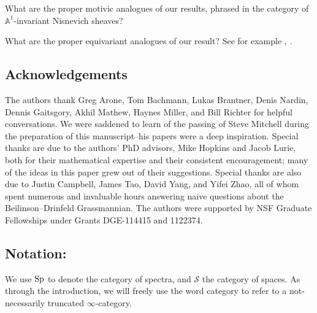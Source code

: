 \begin{qst}
What are the proper motivic analogues of our results, phrased in the category of $\mathbb{A}^1$-invariant Nisnevich sheaves?
\end{qst}

\begin{qst}
What are the proper equivariant analogues of our result?  See for example \cite{Ullman}, \cite{Tynan}.
\end{qst}

\subsection*{Acknowledgements}
The authors thank Greg Arone, Tom Bachmann, Lukas Brantner, Denis Nardin, Dennis Gaitsgory, Akhil Mathew, Haynes Miller, and Bill Richter for helpful conversations.  We were saddened to learn of the passing of Steve Mitchell during the preparation of this manuscript--his papers were a deep inspiration.  Special thanks are due to the authors' PhD advisors, Mike Hopkins and Jacob Lurie, both for their mathematical expertise and their consistent encouragement; many of the ideas in this paper grew out of their suggestions.  Special thanks are also due to Justin Campbell, James Tao, David Yang, and Yifei Zhao, all of whom spent numerous and invaluable hours answering naive questions about the Beilinson--Drinfeld Grassmannian.  The authors were supported by NSF Graduate Fellowships under Grants DGE-114415 and 1122374.

\subsection*{Notation:} We use $\operatorname{\mathrm{Sp}}$ to denote the category of spectra, and $\mathcal{S}$ the category of spaces.  As through the introduction, we will freely use the word category to refer to a not-necessarily truncated $\infty$-category.
